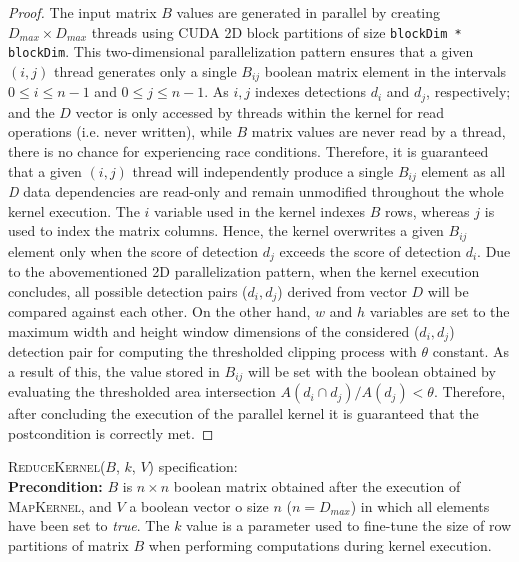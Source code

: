 \begin{proof}
The input matrix $B$ values are generated in parallel by creating $D_{max} \times D_{max}$ threads using CUDA 2D block partitions of size 
\footnotesize\texttt{blockDim * blockDim}\normalsize. This two-dimensional parallelization pattern ensures that a given $(i,j)$ thread 
generates only a single $B_{ij}$ boolean matrix element in the intervals $0 \leq i \leq n-1$ and $0 \leq j \leq n-1$. As $i,j$ indexes 
detections $d_{i}$ and $d_{j}$, respectively; and the $D$ vector is only accessed by threads within the kernel for read operations (i.e. never written), 
while $B$ matrix values are never read by a thread, there is no chance for experiencing race conditions. Therefore, it is guaranteed that a 
given $(i,j)$ thread will independently produce a single $B_{ij}$ element as all \emph{D} data dependencies are read-only and remain unmodified 
throughout the whole kernel execution. The $i$ variable used in the kernel indexes $B$ rows, whereas $j$ is used to index the matrix columns. 
Hence, the kernel overwrites a given $B_{ij}$ element only when the score of detection $d_j$ exceeds the score of detection $d_i$. Due to the 
abovementioned 2D parallelization pattern, when the kernel execution concludes, all possible detection pairs ($d_i,d_j$) derived from vector $D$ will be 
compared against each other. On the other hand, $w$ and $h$ variables are set to the maximum width and height window dimensions of the 
considered ($d_i,d_j$) detection pair for computing the thresholded clipping process with $\theta$ constant. As a result of this, the value 
stored in $B_{ij}$ will be set with the boolean obtained by evaluating the thresholded area intersection $A(d_{i} \cap d_{j}) / A(d_{j}) < \theta$. 
Therefore, after concluding the execution of the parallel kernel it is guaranteed that the postcondition is correctly met.
\end{proof}

\bigbreak

\noindent \textsc{ReduceKernel($B$, $k$, $V$)} specification:\\

\noindent \textbf{Precondition:} $B$ is $n \times n$ boolean matrix obtained after the execution of \textsc{MapKernel}, and $V$ a 
boolean vector o size $n$ ($n = D_{max}$) in which all elements have been set to \emph{true}. The $k$ value is a parameter used 
to fine-tune the size of row partitions of matrix $B$ when performing computations during kernel execution. \\

